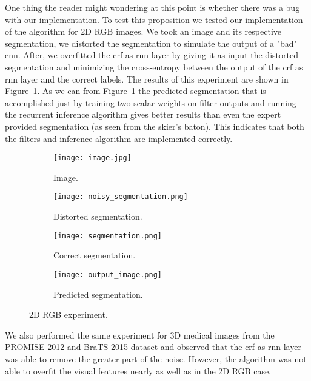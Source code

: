\documentclass{article}
\begin{document}
One thing the reader might wondering at this point is whether there was a bug with our implementation. 
To test this proposition we tested our implementation of the algorithm for 2D RGB images. 
We took an image and its respective segmentation, we distorted the segmentation to simulate the output of a "bad" \gls{cnn}.
After, we overfitted the \gls{crf} as \gls{rnn} layer by giving it as input the distorted segmentation
and minimizing the cross-entropy between the output of the \gls{crf} as \gls{rnn} layer and the correct labels.
The results of this experiment are shown in Figure~\ref{fig:rgb_experiment}. 
As we can from Figure~\ref{fig:rgb_experiment} the predicted segmentation that is accomplished just by training two scalar weights on filter outputs and running the recurrent inference algorithm gives better results than even the expert provided segmentation (as seen from the skier's baton).
This indicates that both the filters and inference algorithm are implemented correctly.

\begin{figure}
\centering
\begin{subfigure}{.25\textwidth}
  \centering
  \texttt{[image: image.jpg]}
  \caption{\centering Image. \protect\linebreak}
\end{subfigure}\begin{subfigure}{.25\textwidth}
  \centering
  \texttt{[image: noisy\_segmentation.png]}
  \caption{\centering Distorted segmentation.}
\end{subfigure}\begin{subfigure}{.25\textwidth}
  \centering
  \texttt{[image: segmentation.png]}
  \caption{\centering Correct segmentation.}
\end{subfigure}\begin{subfigure}{.25\textwidth}
  \centering
  \texttt{[image: output\_image.png]}
  \caption{\centering Predicted segmentation.}
\end{subfigure}\caption{2D RGB experiment.}
\label{fig:rgb_experiment}
\end{figure}

We also performed the same experiment for 3D medical images from the PROMISE 2012 and BraTS 2015 dataset and observed that the \gls{crf} as \gls{rnn} layer was able to remove the greater part of the noise. However, the algorithm was not able to overfit the visual features nearly as well as in the 2D RGB case.
\end{document}
